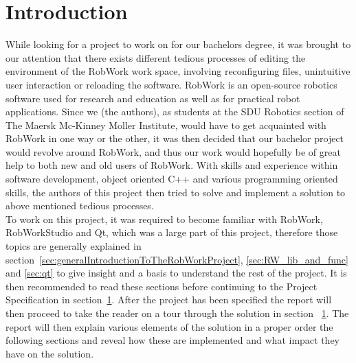 
\section{Introduction}

While looking for a project to work on for our bachelors degree, it was brought to our attention that there exists different tedious processes of editing the environment of the RobWork work space, involving reconfiguring files, unintuitive user interaction or reloading the software. RobWork is an open-source robotics software used for research and education as well as for practical robot applications. Since we (the authors), as students at the SDU Robotics section of The Maersk Mc-Kinney Moller Institute, would have to get acquainted with RobWork in one way or the other, it was then decided that our bachelor project would revolve around RobWork, and thus our work would hopefully be of great help to both new and old users of RobWork. With skills and experience within software development, object oriented C++ and various programming oriented skills, the authors of this project then tried to solve and implement a solution to above mentioned tedious processes.\\

To work on this project, it was required to become familiar with RobWork, RobWorkStudio and Qt, which was a large part of this project, therefore those topics are generally explained in section~\ref{sec:generalIntroductionToTheRobWorkProject}, \ref{sec:RW_lib_and_func} and \ref{sec:qt} to give insight and a basis to understand the rest of the project. It is then recommended to read these sections before continuing to the Project Specification in section~\ref{}. After the project has been specified the report will then proceed to take the reader on a tour through the solution in section ~\ref{}. The report will then explain various elements of the solution in a proper order the following sections and reveal how these are implemented and what impact they have on the solution.
		

\clearpage
